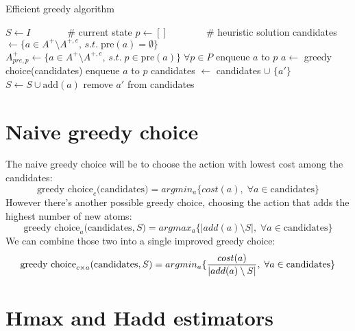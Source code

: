 \begin{algorithm}[h]
    \caption{Efficient greedy algorithm}
    \begin{algorithmic}
        \State $S\gets I\qquad\quad\;\;\;$\# current state
        \State $p\gets []\qquad\qquad$\# heuristic solution
        \State candidates $\gets\{a\in A^+\setminus A^{+,e},\,s.t.\;\mbox{pre}(a)=\emptyset\}$
        \State $A^+_{pre,p}\gets\{a\in A^+\setminus A^{+,e},\,s.t.\;p\in\mbox{pre}(a)\}\;\forall p\in P$
                \State enqueue $a$ to $p$
            \Else
                \State $a\gets$ greedy choice(candidates)
                \State enqueue $a$ to $p$
            \EndIf
                        \State candidates $\gets$ candidates $\cup$ $\{a'\}$
                    \EndIf
                \EndFor
            \EndFor
            \State $S\gets S\cup\mbox{add}(a)$
                    \State remove $a'$ from candidates
                \EndIf
            \EndFor
        \EndWhile
    \end{algorithmic}
\end{algorithm}

\section{Naive greedy choice}
The naive greedy choice will be to choose the action with lowest cost among the candidates:
$$\mbox{greedy choice}_c\mbox{(candidates)}=argmin_a\{cost(a),\;\forall a\in\mbox{candidates}\}$$
However there's another possible greedy choice, choosing the action that adds the highest number of new atoms:
$$\mbox{greedy choice}_a\mbox{(candidates},S)=argmax_a\{|add(a)\setminus S|,\;\forall a\in\mbox{candidates}\}$$
We can combine those two into a single improved greedy choice:
$$\mbox{greedy choice}_{c\times a}\mbox{(candidates},S)=argmin_a\{{cost(a)\over|add(a)\setminus S|},\;\forall a\in\mbox{candidates}\}$$

\section{Hmax and Hadd estimators}

